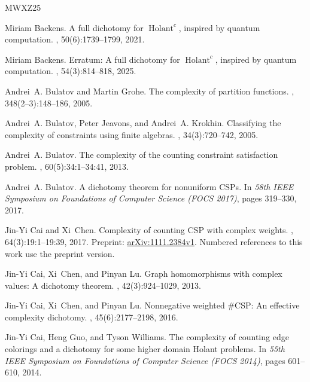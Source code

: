 \documentclass[11pt,letterpaper,onecolumn]{article}
\theoremstyle{plain}
\theoremstyle{definition}
\theoremstyle{remark}
\begin{document}
\clearpage
{}
{}
\begin{thebibliography}{MWXZ25}

Miriam Backens.
\newblock A full dichotomy for {$\operatorname{Holant}^{c}$}, inspired by
  quantum computation.
, 50(6):1739--1799, 2021.

Miriam Backens.
\newblock Erratum: A full dichotomy for {$\operatorname{Holant}^{c}$}, inspired
  by quantum computation.
, 54(3):814--818, 2025.

Andrei~A. Bulatov and Martin Grohe.
\newblock The complexity of partition functions.
, 348(2--3):148--186, 2005.

Andrei~A. Bulatov, Peter Jeavons, and Andrei~A. Krokhin.
\newblock Classifying the complexity of constraints using finite algebras.
, 34(3):720--742, 2005.

Andrei~A. Bulatov.
\newblock The complexity of the counting constraint satisfaction problem.
, 60(5):34:1--34:41, 2013.

Andrei~A. Bulatov.
\newblock A dichotomy theorem for nonuniform {CSPs}.
\newblock In {\em 58th IEEE Symposium on Foundations of Computer Science (FOCS
  2017)}, pages 319--330, 2017.

Jin-Yi Cai and Xi~Chen.
\newblock Complexity of counting {CSP} with complex weights.
, 64(3):19:1--19:39, 2017.
\newblock Preprint:
  \href{https://arxiv.org/abs/1111.2384v1}{arXiv:1111.2384v1}. Numbered
  references to this work use the preprint version.

Jin-Yi Cai, Xi~Chen, and Pinyan Lu.
\newblock Graph homomorphisms with complex values: A dichotomy theorem.
, 42(3):924--1029, 2013.

Jin-Yi Cai, Xi~Chen, and Pinyan Lu.
\newblock Nonnegative weighted {{\#CSP}}: An effective complexity dichotomy.
, 45(6):2177--2198, 2016.

Jin-Yi Cai, Heng Guo, and Tyson Williams.
\newblock The complexity of counting edge colorings and a dichotomy for some
  higher domain {Holant} problems.
\newblock In {\em 55th IEEE Symposium on Foundations of Computer Science (FOCS
  2014)}, pages 601--610, 2014.


\end{thebibliography}
\end{document}

